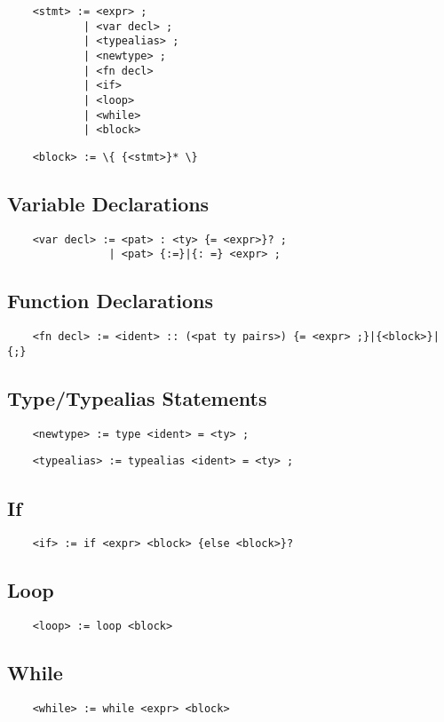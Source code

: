 \documentclass[a4paper]{article}
\begin{document}
\begin{verbatim}
    <stmt> := <expr> ;
            | <var decl> ;
            | <typealias> ;
            | <newtype> ;
            | <fn decl>
            | <if>
            | <loop>
            | <while>
            | <block>
\end{verbatim}

\begin{verbatim}
    <block> := \{ {<stmt>}* \}
\end{verbatim}

\subsection{Variable Declarations}

\begin{verbatim}
    <var decl> := <pat> : <ty> {= <expr>}? ;
                | <pat> {:=}|{: =} <expr> ;
\end{verbatim}

\subsection{Function Declarations}

\begin{verbatim}
    <fn decl> := <ident> :: (<pat ty pairs>) {= <expr> ;}|{<block>}|{;}
\end{verbatim}

\subsection{Type/Typealias Statements}

\begin{verbatim}
    <newtype> := type <ident> = <ty> ;
\end{verbatim}

\begin{verbatim}
    <typealias> := typealias <ident> = <ty> ;
\end{verbatim}

\subsection{If}

\begin{verbatim}
    <if> := if <expr> <block> {else <block>}?
\end{verbatim}

\subsection{Loop}

\begin{verbatim}
    <loop> := loop <block>
\end{verbatim}

\subsection{While}

\begin{verbatim}
    <while> := while <expr> <block>
\end{verbatim}
\end{document}
